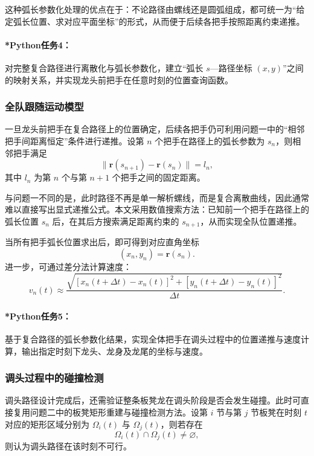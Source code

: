 \documentclass[12pt,a4paper]{ctexart}
\begin{document}
这种弧长参数化处理的优点在于：不论路径由螺线还是圆弧组成，都可统一为“给定弧长位置、求对应平面坐标”的形式，从而便于后续各把手按照距离约束递推。

\paragraph{*Python任务4：}
对完整复合路径进行离散化与弧长参数化，建立“弧长 $s$—路径坐标 $(x,y)$”之间的映射关系，并实现龙头前把手在任意时刻的位置查询函数。

\subsubsection{全队跟随运动模型}
一旦龙头前把手在复合路径上的位置确定，后续各把手仍可利用问题一中的“相邻把手间距离恒定”条件进行递推。设第 $n$ 个把手在路径上的弧长参数为 $s_n$，则相邻把手满足
\begin{equation}
\|\bm{r}(s_{n+1})-\bm{r}(s_n)\|=l_n,
\end{equation}
其中 $l_n$ 为第 $n$ 个与第 $n+1$ 个把手之间的固定距离。

与问题一不同的是，此时路径不再是单一解析螺线，而是复合离散曲线，因此通常难以直接写出显式递推公式。本文采用数值搜索方法：已知前一个把手在路径上的弧长位置 $s_n$ 后，在其后方搜索满足距离约束的 $s_{n+1}$，从而实现全队位置递推。

当所有把手弧长位置求出后，即可得到对应直角坐标
\begin{equation}
(x_n,y_n)=\bm{r}(s_n).
\end{equation}
进一步，可通过差分法计算速度：
\begin{equation}
v_n(t)\approx
\frac{\sqrt{[x_n(t+\Delta t)-x_n(t)]^2+[y_n(t+\Delta t)-y_n(t)]^2}}{\Delta t}.
\end{equation}

\paragraph{*Python任务5：}
基于复合路径的弧长参数化结果，实现全体把手在调头过程中的位置递推与速度计算，输出指定时刻下龙头、龙身及龙尾的坐标与速度。

\subsubsection{调头过程中的碰撞检测}
调头路径设计完成后，还需验证整条板凳龙在调头阶段是否会发生碰撞。此时可直接复用问题二中的板凳矩形重建与碰撞检测方法。设第 $i$ 节与第 $j$ 节板凳在时刻 $t$ 对应的矩形区域分别为 $\Omega_i(t)$ 与 $\Omega_j(t)$，则若存在
\begin{equation}
\Omega_i(t)\cap\Omega_j(t)\neq\varnothing,
\end{equation}
则认为调头路径在该时刻不可行。
\end{document}
